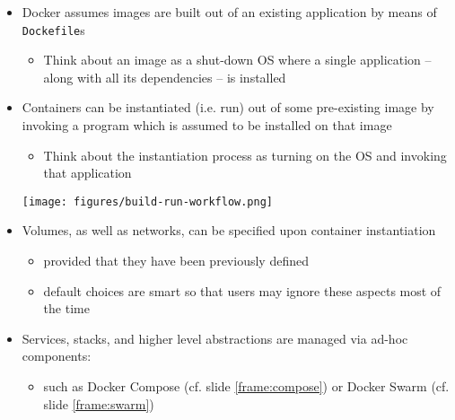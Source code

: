 \documentclass[presentation]{beamer}\mode<presentation>{\usetheme{AMSBolognaFC}}
\begin{document}
\begin{frame}[allowframebreaks]
    \framebreak

    \begin{itemize}

        \item Docker assumes images are \alert{built} out of an existing application by means of \alert{\texttt{Dockefile}s}

        \begin{itemize}
            \item Think about an image as a shut-down OS where a single application -- along with all its dependencies -- is installed
        \end{itemize}

        \smallskip

        \item Containers can be instantiated (i.e. \alert{run}) out of some pre-existing image by invoking a program which is assumed to be installed on that image

        \begin{itemize}
            \item Think about the instantiation process as turning on the OS and invoking that application
        \end{itemize}

        \smallskip

        \begin{center}
            \texttt{[image: figures/build-run-workflow.png]}
        \end{center}

        \framebreak

        \item Volumes, as well as networks, can be specified upon container instantiation
        \begin{itemize}
            \item provided that they have been previously defined
            \item default choices are smart so that users may ignore these aspects most of the time
        \end{itemize}

        \bigskip

        \item Services, stacks, and higher level abstractions are managed via ad-hoc components:
        \begin{itemize}
            \item such as Docker \alert{Compose} (cf. slide \ref{frame:compose}) or Docker \alert{Swarm} (cf. slide \ref{frame:swarm})
        \end{itemize}

    \end{itemize}

\end{frame}
\end{document}
